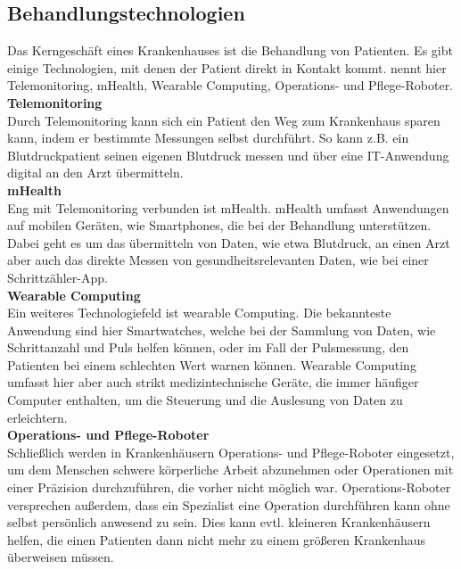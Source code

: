 \subsection{Behandlungstechnologien}
	Das Kerngeschäft eines Krankenhauses ist die Behandlung von Patienten. Es gibt einige Technologien, mit denen der Patient direkt in Kontakt kommt.
	\cite{braeutigam2017} nennt hier Telemonitoring, mHealth, Wearable Computing, Operations- und Pflege-Roboter.
	\vspace{\parheadvspace}\\
	\textbf{Telemonitoring}\\
	Durch Telemonitoring kann sich ein Patient den Weg zum Krankenhaus sparen kann, indem er bestimmte Messungen selbst durchführt. So kann z.B. ein Blutdruckpatient seinen eigenen Blutdruck messen und über eine IT-Anwendung digital an den Arzt übermitteln. 
	\vspace{\parheadvspace}\\
	\textbf{mHealth}\\
	Eng mit Telemonitoring verbunden ist mHealth. mHealth umfasst Anwendungen auf mobilen Geräten, wie Smartphones, die bei der Behandlung unterstützen. Dabei geht es um das übermitteln von Daten, wie etwa Blutdruck, an einen Arzt aber auch das direkte Messen von gesundheitsrelevanten Daten, wie bei einer Schrittzähler-App. \parencite{Matusiewicz2017}
	\vspace{\parheadvspace}\\
	\textbf{Wearable Computing}\\
	Ein weiteres Technologiefeld ist wearable Computing. Die bekannteste Anwendung sind hier Smartwatches, welche bei der Sammlung von Daten, wie Schrittanzahl und Puls helfen können, oder im Fall der Pulsmessung, den Patienten bei einem schlechten Wert warnen können. Wearable Computing umfasst hier aber auch strikt medizintechnische Geräte, die immer häufiger Computer enthalten, um die Steuerung und die Auslesung von Daten zu erleichtern. \parencite{Gerke2017}
	\vspace{\parheadvspace}\\
	\textbf{Operations- und Pflege-Roboter}\\
	Schließlich werden in Krankenhäusern Operations- und Pflege-Roboter eingesetzt, um dem Menschen schwere körperliche Arbeit abzunehmen oder Operationen mit einer Präzision durchzuführen, die vorher nicht möglich war. Operations-Roboter versprechen außerdem, dass ein Spezialist eine Operation durchführen kann ohne selbst persönlich anwesend zu sein. Dies kann evtl. kleineren Krankenhäusern helfen, die einen Patienten dann nicht mehr zu einem größeren Krankenhaus überweisen müssen. \parencite{Bardash2010}
